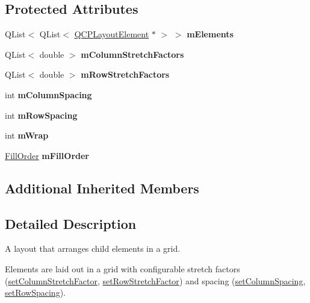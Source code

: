 \subsection*{Protected Attributes}
\begin{DoxyCompactItemize}
\item 
\mbox{\label{classQCPLayoutGrid_a3577d3855bf8ad20ef9079291a49f397}} 
Q\+List$<$ Q\+List$<$ \hyperlink{classQCPLayoutElement}{Q\+C\+P\+Layout\+Element} $\ast$ $>$ $>$ {\bfseries m\+Elements}
\item 
\mbox{\label{classQCPLayoutGrid_ac6aabe62339f94f18b9f8adab94b1840}} 
Q\+List$<$ double $>$ {\bfseries m\+Column\+Stretch\+Factors}
\item 
\mbox{\label{classQCPLayoutGrid_a36c85a7eaf342680fb9b8a4977486f16}} 
Q\+List$<$ double $>$ {\bfseries m\+Row\+Stretch\+Factors}
\item 
\mbox{\label{classQCPLayoutGrid_ae9ac48f0791be07ead0a96dbd5622770}} 
int {\bfseries m\+Column\+Spacing}
\item 
\mbox{\label{classQCPLayoutGrid_a8b67f183f4645739cc4c794d75843b40}} 
int {\bfseries m\+Row\+Spacing}
\item 
\mbox{\label{classQCPLayoutGrid_a17d90c289139847f68cca9e75d64b0fd}} 
int {\bfseries m\+Wrap}
\item 
\mbox{\label{classQCPLayoutGrid_a35a20072cbca5659dd75ca74eae87beb}} 
\hyperlink{classQCPLayoutGrid_a7d49ee08773de6b2fd246edfed353cca}{Fill\+Order} {\bfseries m\+Fill\+Order}
\end{DoxyCompactItemize}
\subsection*{Additional Inherited Members}


\subsection{Detailed Description}
A layout that arranges child elements in a grid. 

Elements are laid out in a grid with configurable stretch factors (\hyperlink{classQCPLayoutGrid_ae38f31a71687b9d7ee3104852528fb50}{set\+Column\+Stretch\+Factor}, \hyperlink{classQCPLayoutGrid_a7b0273de5369bd93d942edbaf5b166ec}{set\+Row\+Stretch\+Factor}) and spacing (\hyperlink{classQCPLayoutGrid_a3a49272aba32bb0fddc3bb2a45a3dba0}{set\+Column\+Spacing}, \hyperlink{classQCPLayoutGrid_aaef2cd2d456197ee06a208793678e436}{set\+Row\+Spacing}).

